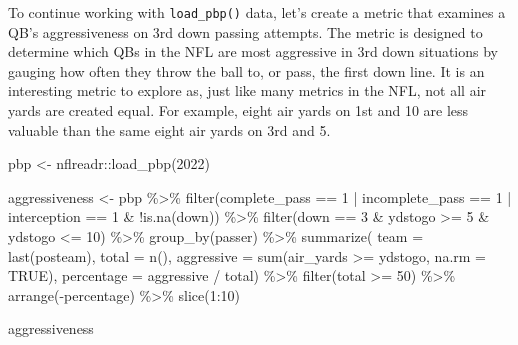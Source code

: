 \documentclass[
  letterpaper,
]{krantz}
\newenvironment{Shaded}{\begin{snugshade}}{\end{snugshade}}
\newcommand{\AttributeTok}[1]{\textcolor[rgb]{0.40,0.45,0.13}{#1}}
\newcommand{\ConstantTok}[1]{\textcolor[rgb]{0.56,0.35,0.01}{#1}}
\newcommand{\DecValTok}[1]{\textcolor[rgb]{0.68,0.00,0.00}{#1}}
\newcommand{\FunctionTok}[1]{\textcolor[rgb]{0.28,0.35,0.67}{#1}}
\newcommand{\NormalTok}[1]{\textcolor[rgb]{0.00,0.23,0.31}{#1}}
\newcommand{\OtherTok}[1]{\textcolor[rgb]{0.00,0.23,0.31}{#1}}
\newcommand{\SpecialCharTok}[1]{\textcolor[rgb]{0.37,0.37,0.37}{#1}}
\begin{document}
To continue working with \texttt{load\_pbp()} data, let's create a
metric that examines a QB's aggressiveness on 3rd down passing attempts.
The metric is designed to determine which QBs in the NFL are most
aggressive in 3rd down situations by gauging how often they throw the
ball to, or pass, the first down line. It is an interesting metric to
explore as, just like many metrics in the NFL, not all air yards are
created equal. For example, eight air yards on 1st and 10 are less
valuable than the same eight air yards on 3rd and 5.

\begin{Shaded}
\begin{Highlighting}[]
\NormalTok{pbp }\OtherTok{\textless{}{-}}\NormalTok{ nflreadr}\SpecialCharTok{::}\FunctionTok{load\_pbp}\NormalTok{(}\DecValTok{2022}\NormalTok{)}

\NormalTok{aggressiveness }\OtherTok{\textless{}{-}}\NormalTok{ pbp }\SpecialCharTok{\%\textgreater{}\%}
  \FunctionTok{filter}\NormalTok{(complete\_pass }\SpecialCharTok{==} \DecValTok{1} \SpecialCharTok{|}
\NormalTok{           incomplete\_pass }\SpecialCharTok{==} \DecValTok{1} \SpecialCharTok{|}
\NormalTok{           interception }\SpecialCharTok{==} \DecValTok{1} \SpecialCharTok{\&}
           \SpecialCharTok{!}\FunctionTok{is.na}\NormalTok{(down)) }\SpecialCharTok{\%\textgreater{}\%}
  \FunctionTok{filter}\NormalTok{(down }\SpecialCharTok{==} \DecValTok{3} \SpecialCharTok{\&}\NormalTok{ ydstogo }\SpecialCharTok{\textgreater{}=} \DecValTok{5} \SpecialCharTok{\&}\NormalTok{ ydstogo }\SpecialCharTok{\textless{}=} \DecValTok{10}\NormalTok{) }\SpecialCharTok{\%\textgreater{}\%}
  \FunctionTok{group\_by}\NormalTok{(passer) }\SpecialCharTok{\%\textgreater{}\%}
  \FunctionTok{summarize}\NormalTok{(}
    \AttributeTok{team =} \FunctionTok{last}\NormalTok{(posteam),}
    \AttributeTok{total =} \FunctionTok{n}\NormalTok{(),}
    \AttributeTok{aggressive =} \FunctionTok{sum}\NormalTok{(air\_yards }\SpecialCharTok{\textgreater{}=}\NormalTok{ ydstogo, }\AttributeTok{na.rm =} \ConstantTok{TRUE}\NormalTok{),}
    \AttributeTok{percentage =}\NormalTok{ aggressive }\SpecialCharTok{/}\NormalTok{ total) }\SpecialCharTok{\%\textgreater{}\%}
  \FunctionTok{filter}\NormalTok{(total }\SpecialCharTok{\textgreater{}=} \DecValTok{50}\NormalTok{) }\SpecialCharTok{\%\textgreater{}\%}
  \FunctionTok{arrange}\NormalTok{(}\SpecialCharTok{{-}}\NormalTok{percentage) }\SpecialCharTok{\%\textgreater{}\%}
  \FunctionTok{slice}\NormalTok{(}\DecValTok{1}\SpecialCharTok{:}\DecValTok{10}\NormalTok{)}

\NormalTok{aggressiveness}
\end{Highlighting}
\end{Shaded}
\end{document}
